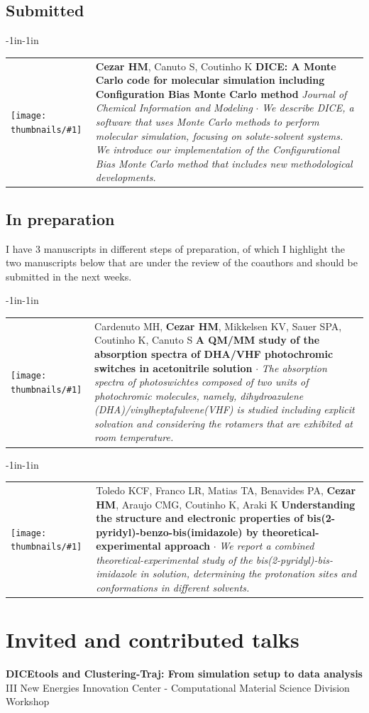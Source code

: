 \documentclass[10pt]{article}
\newcommand{\newarticle}[7]{
\begin{adjustwidth}{-1in}{-1in}  
\begin{tabular}{p{0.9in}p{7in}}
\parbox[c]{0.9in}{\texttt{[image: thumbnails/\#1]}} & \parbox[c]{6in}{\setstretch{0.9} {\scriptsize {#2}} \\ {\bf #3}  \\ {\small #4} $\cdot$ \href{#6}{#5} \\ {\footnotesize\emph {#7}}}
\end{tabular}
\end{adjustwidth}
\vspace{0.2in}
}
\newcommand{\talk}[2]{
\noindent\marginpar{
   \scriptsize \scshape
  #2 \\ #1
}}
\begin{document}
\subsection*{Submitted}
\newarticle{cbmc_dice.png}{\textbf{Cezar HM}, Canuto S, Coutinho K}{DICE: A Monte Carlo code for molecular simulation including Configuration Bias Monte Carlo method}{\emph{Journal of Chemical Information and Modeling}}{}{}{We describe DICE, a software that uses Monte Carlo methods to perform molecular simulation, focusing on solute-solvent systems. We introduce our implementation of the Configurational Bias Monte Carlo method that includes new methodological developments.}

\subsection*{In preparation}
I have 3 manuscripts in different steps of preparation, of which I highlight the two manuscripts below that are under the review of the coauthors and should be submitted in the next weeks.
\\

\newarticle{dha-vhf.png}{Cardenuto MH, \textbf{Cezar HM}, Mikkelsen KV, Sauer SPA, Coutinho K, Canuto S}{A QM/MM study of the absorption spectra of DHA/VHF photochromic switches in acetonitrile solution}{}{}{}{The absorption spectra of photoswichtes composed of two units of photochromic molecules, namely, dihydroazulene (DHA)/vinylheptafulvene(VHF) is studied including explicit solvation and considering the rotamers that are exhibited at room temperature.}

\newarticle{dpbimH.png}{Toledo KCF, Franco LR, Matias TA, Benavides PA, \textbf{Cezar HM}, Araujo CMG, Coutinho K, Araki K}{Understanding the structure and electronic properties of bis(2-pyridyl)-benzo-bis(imidazole) by theoretical-experimental approach}{}{}{}{We report a combined theoretical-experimental study of the bis(2-pyridyl)-bis-imidazole in solution, determining the protonation sites and conformations in different solvents.}

\section*{Invited and contributed talks}
\talk{Sep 2019}{S\~ao Carlos, SP}\textbf{DICEtools and Clustering-Traj: From simulation setup to data analysis} \\ III New Energies Innovation Center - Computational Material Science Division Workshop\\[0.05in]
\end{document}

